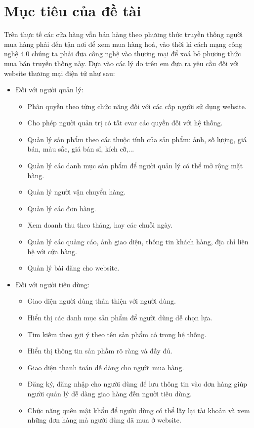 \section{Mục tiêu của đề tài}
Trên thực tế các cửa hàng vẫn bán hàng theo phương thức truyền thống người mua hàng phải đến tận nơi để xem mua hàng hoá, vào thời kì cách mạng công nghệ 4.0 chúng ta phải đưa công nghệ vào thương mại để xoá bỏ phương thức mua bán truyền thống này. Dựa vào các lý do trên em đưa ra yêu cầu đối với website thương mại điện tử như sau:
\begin{itemize}
\item Đối với người quản lý:
\begin{itemize}
\item Phân quyền theo từng chức năng đối với các cấp người sử dụng website.
\item Cho phép người quản trị có tất cvar các quyền đối với hệ thống.
\item Quản lý sản phẩm theo các thuộc tính của sản phẩm: ảnh, số lượng, giá bán, màu sắc, giá bán sỉ, kích cỡ,...
\item Quản lý các danh mục sản phẩm để người quản lý có thể mở rộng mặt hàng.
\item Quản lý người vận chuyển hàng.
\item Quản lý các đơn hàng.
\item Xem doanh thu theo tháng, hay các chuỗi ngày.
\item Quản lý các quảng cáo, ảnh giao diện, thông tin khách hàng, địa chỉ liên hệ với cửa hàng.
\item Quản lý bài đăng cho website.
\end{itemize}
\item Đối với người tiêu dùng:
\begin{itemize}
\item Giao diện người dùng thân thiện với người dùng.
\item Hiển thị các danh mục sản phẩm để người dùng dễ chọn lựa.
\item Tìm kiếm theo gợi ý theo tên sản phẩm có trong hệ thống.
\item Hiển thị thông tin sản phầm rõ ràng và đầy đủ.
\item Giao diện thanh toán dễ dàng cho người mua hàng.
\item Đăng ký, đăng nhập cho người dùng để lưu thông tin vào đơn hàng giúp người quản lý dễ dàng giao hàng đến người tiêu dùng.
\item Chức năng quên mật khẩu để người dùng có thể lấy lại tài khoản và xem những đơn hàng mà người dùng đã mua ở website.
\end{itemize}
\end{itemize}
